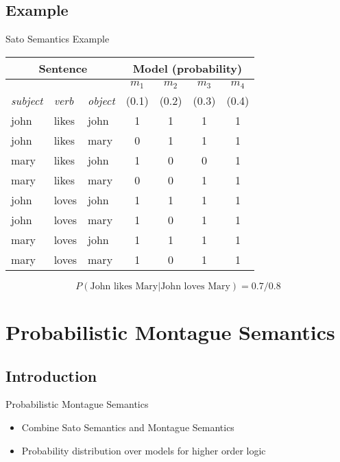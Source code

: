 \documentclass{beamer}
\newlength{\wideitemsep}
\let\olditem\item
\renewcommand{\item}{\setlength{\itemsep}{\wideitemsep}\olditem}
\begin{document}
\subsection{Example}

\begin{frame}{Sato Semantics Example}
\begin{center}
\begin{tabular}{|l|l|l||c|c|c|c|}
\hline
\multicolumn{3}{|c||}{Sentence} & \multicolumn{4}{c|}{Model (probability)}\\
\hline
& & & $m_1$& $m_2$& $m_3$& $m_4$\\
\emph{subject} & \emph{verb} & \emph{object} & (0.1)& (0.2)& (0.3)& (0.4)\\
\hline
john & likes & john & 1 & 1 & 1 & 1\\
john & likes & mary & 0 & 1 & 1 & 1\\
mary & likes & john & 1 & 0 & 0 & 1\\
mary & likes & mary & 0 & 0 & 1 & 1\\
john & loves & john & 1 & 1 & 1 & 1\\
john & loves & mary & 1 & 0 & 1 & 1\\
mary & loves & john & 1 & 1 & 1 & 1\\
mary & loves & mary & 1 & 0 & 1 & 1\\
\hline
\end{tabular}
\end{center}
$$P(\text{John likes Mary}|\text{John loves Mary}) = 0.7/0.8 $$
\end{frame}

\section{Probabilistic Montague Semantics}

\subsection{Introduction}

\begin{frame}{Probabilistic Montague Semantics}
\begin{itemize}
\item Combine Sato Semantics and Montague Semantics
\item Probability distribution over models for higher order logic
\end{itemize}
\end{frame}
\end{document}

